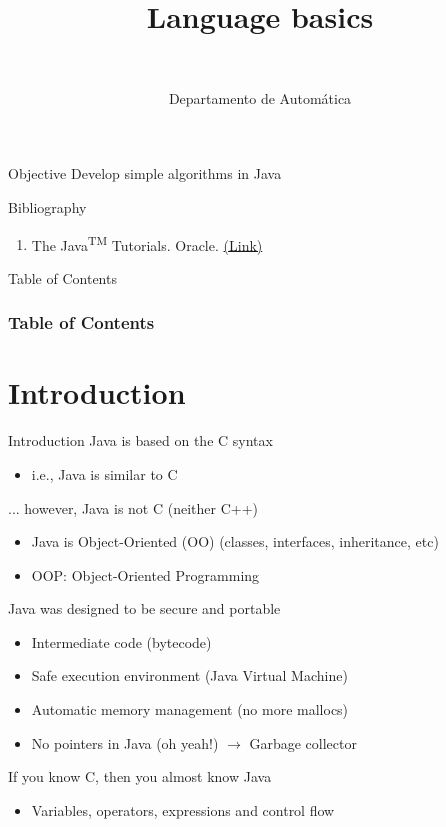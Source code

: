 \documentclass[10pt,compress]{beamer} %
\title[Language basics]{Language basics}
\author{\asignatura\\\carrera}
\institute{}
\date{Departamento de Automática}
\begin{document}
{\titlepageBlue
    \begin{frame}
        \titlepage
    \end{frame}
}

\institute{\asignatura}

\begin{frame}[plain]{}
   \begin{block}{Objective}
       Develop simple algorithms in Java
   \end{block}

   \begin{block}{Bibliography}
      \begin{enumerate}
          \item The Java\textsuperscript{TM} Tutorials. Oracle. \href{https://docs.oracle.com/javase/tutorial/}{(Link)}
      \end{enumerate} 
   \end{block}

\end{frame}

{
\begin{frame}[shrink]{Table of Contents}
 \frametitle{Table of Contents}
 \tableofcontents
\end{frame}
}

\section{Introduction}
\begin{frame}{Introduction}
	Java is based on the C syntax
		\begin{itemize}
		\item i.e., Java is similar to C
		\end{itemize}
	... however, Java is not C (neither C++)
		\begin{itemize}
		\item Java is Object-Oriented (OO) (classes, interfaces, inheritance, etc)
		\item OOP: Object-Oriented Programming
		\end{itemize}
	Java was designed to be secure and portable
		\begin{itemize}
		\item Intermediate code (bytecode)
		\item Safe execution environment (Java Virtual Machine)
		\item Automatic memory management (no more mallocs)
		\item No pointers in Java (oh yeah!) $\rightarrow$ \alert{Garbage collector}
		\end{itemize}
	If you know C, then you almost know Java
		\begin{itemize}
		\item Variables, operators, expressions and control flow
		\end{itemize}
\end{frame}
\end{document}
